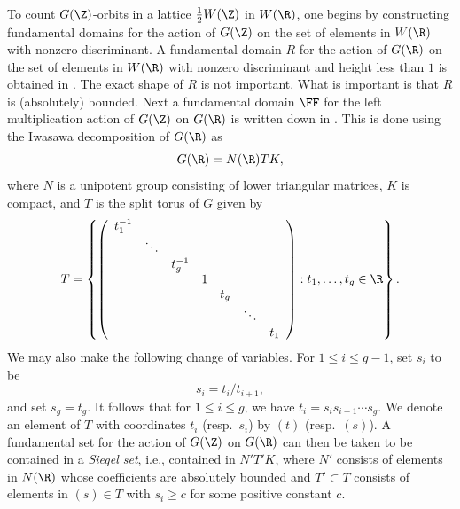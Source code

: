 To count $G(\Z)$-orbits in a lattice $\frac12W(\Z)$ in $W(\R)$, one
begins by constructing fundamental domains for the action of $G(\Z)$
on the set of elements in $W(\R)$ with nonzero discriminant. A
fundamental domain $R$ for the action of $G(\R)$ on the set of
elements in $W(\R)$ with nonzero discriminant and height less than $1$
is obtained in \cite[\S9.1]{BG2}. The exact shape of $R$ is not
important. What is important is that $R$ is (absolutely) bounded. Next
a fundamental domain $\FF$ for the left multiplication action of
$G(\Z)$ on $G(\R)$ is written down in \cite[\S9.2]{BG2}. This is done
using the Iwasawa decomposition of $G(\R)$ as
$$
G(\R)=N(\R)TK,
$$ where $N$ is a unipotent group consisting of lower triangular matrices, $K$ is compact, and $T$ is the split torus of $G$ given by
\begin{equation*}
T=
\left\{\left(\begin{array}{ccccccc}
 t_1^{-1}&&&&&&\\
&\ddots &&&&&  \\
 && t_{g}^{-1} &&&&\\
&&& 1 &&&\\
 &&&& t_g &&\\
&&&&&\ddots &  \\
& &&&&& t_{1}
\end{array}\right):t_1,\ldots,t_g\in\R\right\}.
\end{equation*}
We may also make the following change of variables. For $1\leq
i\leq g-1$, set $s_i$ to be
$$
s_i=t_i/t_{i+1},
$$ and set $s_g=t_g$.  It follows that for $1\leq i\leq g$, we have
$t_i = s_is_{i+1}\cdots s_g.$ We denote an element of $T$ with
coordinates $t_i$ (resp.\ $s_i$) by $(t)$ (resp.\ $(s)$). A
fundamental set for the action of $G(\Z)$ on $G(\R)$ can then be taken
to be contained in a {\it Siegel set}, i.e., contained in $N'T'K$,
where $N'$ consists of elements in $N(\R)$ whose coefficients are
absolutely bounded and $T'\subset T$ consists of elements in $(s)\in
T$ with $s_i\geq c$ for some positive constant $c$.


